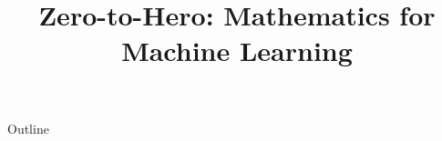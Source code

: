 \documentclass[xcolor=dvipsnames,compress,t,pdf,9pt]{beamer}
\title[\insertframenumber /\inserttotalframenumber]{Zero-to-Hero: Mathematics for Machine Learning}
\begin{document}
	\begin{frame}
	\titlepage
	\end{frame}

	\begin{frame}{Outline}
	    \tableofcontents
	\end{frame}

	
	
	
	
\end{document}

